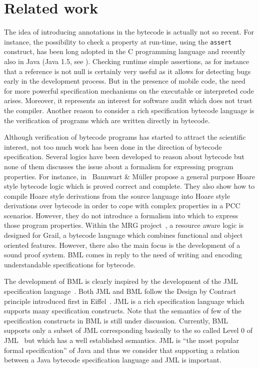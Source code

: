 

\section{Related work}\label{bml:relWork}

The idea of introducing annotations in the bytecode is actually not so recent.  
For instance, the possibility to check a property at run-time, using the \texttt{assert}
 construct, has been long adopted in the C programming language and recently also in Java (Java
1.5, see \cite[\S 14.10]{JLS}). Checking runtime simple assertions,
 as for instance that a reference is not  null is certainly very useful as it
 allows for detecting bugs early in the development process.    
But  in the presence of mobile code, the need for more
 powerful specification mechanisms on the executable or interpreted code arises. Moreover, it  represents an interest  
 for software audit which does not trust the compiler. Another reason to 
 consider a rich specification bytecode language  is the verification of programs which
 are written directly in bytecode. 

Although verification of bytecode programs has started to attract 
the scientific interest,  not too much work has been done in
the direction of bytecode specification. Several logics have been developed to reason about
bytecode but none of them discusses the issue about a formalism for expressing program properties.
For instance, in~\cite{BannwartMueller05} Bannwart \& M\"uller propose a general purpose Hoare style bytecode logic
 which is proved correct and complete. They also show how to compile Hoare style derivations 
from the source language into Hoare style derivations over bytecode in order to cope with complex properties in a PCC scenarios.
 However, they do not introduce a formalism into which to
 express those program properties. Within the MRG project~\cite{AspinallEtAl:TPHOLs2004}, a resource aware logic is designed for Grail, a bytecode
language which combines functional and object oriented features.  However, there also the main focus is the development of a sound proof system.
 BML comes in reply to the need of  writing  and encoding understandable specifications for
bytecode.

The development of BML is clearly inspired by the development of the
JML specification language~\cite{JMLRefMan}. Both JML and
BML follow the Design by Contract principle introduced first in
Eiffel~\cite{Meyer97}. JML is a rich specification language which supports many specification constructs. Note that the semantics of 
 few of the specification  constructs in BML is still under discussion. Currently, BML supports only a subset of JML  corresponding
basically to the so called Level 0 of JML~\cite{JMLRefMan} but  which has a well established semantics.
JML is ``the most popular formal specification'' of Java and thus 
we consider that supporting a relation between a Java bytecode specification language and JML is important.  

